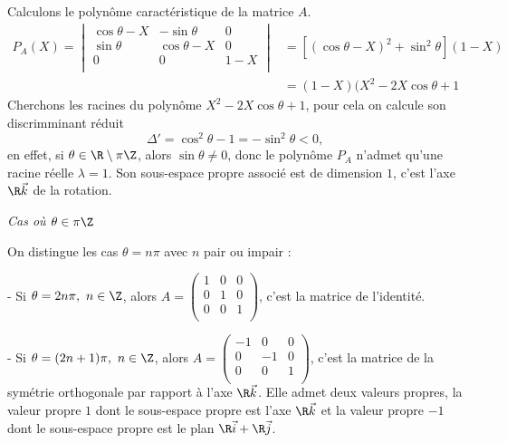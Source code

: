 {\begin{enumerate}
{Calculons le polyn\^ome caractéristique de la matrice $A$.
\begin{align*}
 P_A(X)=\begin{vmatrix}\cos\theta-X&-\sin\theta&0 \\  \sin\theta&\cos\theta-X&0 \\ 0&0&1-X \\ \end{vmatrix} &=[(\cos\theta-X)^2+\sin^2\theta](1-X) \\  &=(1-X)(X^2-2X\cos\theta+1
\end{align*}
Cherchons les racines du polynôme $X^2-2X\cos\theta+1$, pour cela on calcule son discrimminant réduit
$$\Delta'=\cos^2\theta-1=-\sin^2\theta<0,$$
en effet, si $\theta\in\R\setminus\pi\Z$, alors $\sin\theta\neq 0$, donc le polyn\^ome $P_A$ n'admet qu'une racine réelle $\lambda=1$. Son sous-espace propre associé est de dimension $1$, c'est l'axe $\R\vec k$ de la rotation. 

{\it Cas où $\theta\in\pi\Z$ }

On distingue les cas $\theta=n\pi$ avec $n$ pair ou impair :

- Si $\theta=2n\pi,\ n\in\Z$, alors $\displaystyle A=\begin{pmatrix}1&0&0 \\  0&1&0 \\ 0&0&1 \\ \end{pmatrix}$, c'est la matrice de l'identité.

- Si $\theta=(2n+1)\pi,\ n\in\Z$, alors $\displaystyle A=\begin{pmatrix}-1&0&0 \\  0&-1&0 \\ 0&0&1 \\ \end{pmatrix}$, c'est la matrice de la symétrie orthogonale par rapport à l'axe $\R\vec k$. Elle admet deux valeurs propres, la valeur propre $1$ dont le sous-espace propre est l'axe $\R\vec k$ et la valeur propre $-1$ dont le sous-espace propre est le plan $\R\vec i+\R\vec j$.}
\end{enumerate}
}
